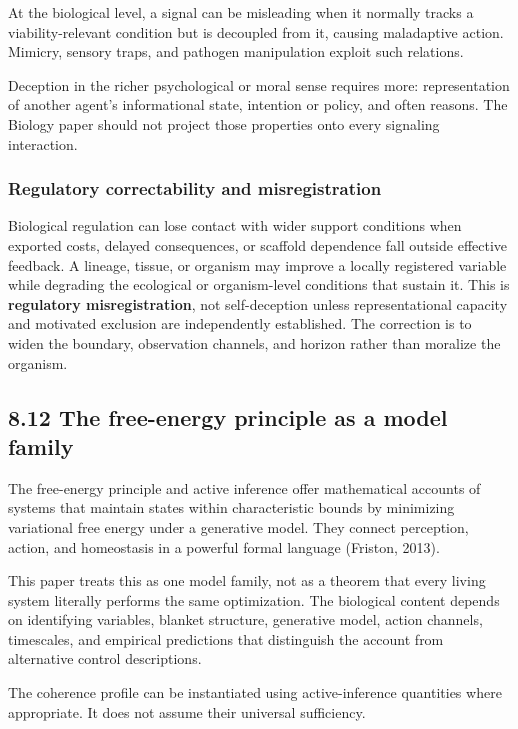 \documentclass[
  11pt,
]{article}
\begin{document}
At the biological level, a signal can be misleading when it normally
tracks a viability-relevant condition but is decoupled from it, causing
maladaptive action. Mimicry, sensory traps, and pathogen manipulation
exploit such relations.

Deception in the richer psychological or moral sense requires more:
representation of another agent's informational state, intention or
policy, and often reasons. The Biology paper should not project those
properties onto every signaling interaction.

\subsubsection{Regulatory correctability and
misregistration}\label{regulatory-correctability-and-misregistration}

Biological regulation can lose contact with wider support conditions
when exported costs, delayed consequences, or scaffold dependence fall
outside effective feedback. A lineage, tissue, or organism may improve a
locally registered variable while degrading the ecological or
organism-level conditions that sustain it. This is \textbf{regulatory
misregistration}, not self-deception unless representational capacity
and motivated exclusion are independently established. The correction is
to widen the boundary, observation channels, and horizon rather than
moralize the organism.

\subsection{8.12 The free-energy principle as a model
family}\label{the-free-energy-principle-as-a-model-family}

The free-energy principle and active inference offer mathematical
accounts of systems that maintain states within characteristic bounds by
minimizing variational free energy under a generative model. They
connect perception, action, and homeostasis in a powerful formal
language (Friston, 2013).

This paper treats this as one model family, not as a theorem that every
living system literally performs the same optimization. The biological
content depends on identifying variables, blanket structure, generative
model, action channels, timescales, and empirical predictions that
distinguish the account from alternative control descriptions.

The coherence profile can be instantiated using active-inference
quantities where appropriate. It does not assume their universal
sufficiency.
\end{document}
